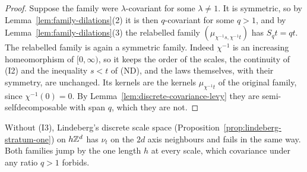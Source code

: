 \begin{proof}
Suppose the family were $\lambda$-covariant for some $\lambda \ne 1$. It is symmetric, so by
Lemma~\ref{lem:family-dilations}(2) it is then $q$-covariant for some $q > 1$, and by
Lemma~\ref{lem:family-dilations}(3) the relabelled family $(\mu_{\chi^{-1}s,\chi^{-1}t})$ has
$S_qt = qt$. The relabelled family is again a symmetric family. Indeed $\chi^{-1}$ is an increasing
homeomorphism of $[0,\infty)$, so it keeps the order of the scales, the continuity of (I2) and the
inequality $s < t$ of (ND), and the laws themselves, with their symmetry, are unchanged. Its
kernels are the kernels $\mu_{\chi^{-1}t}$ of the original family, since $\chi^{-1}(0) = 0$. By
Lemma~\ref{lem:discrete-covariance-levy} they are semi-selfdecomposable with span $q$, which they
are not.
\end{proof}

Without (I3), Lindeberg's discrete scale space (Proposition~\ref{prop:lindeberg-stratum-one}) on
$h\mathbb{Z}^d$ has $\nu_t$ on the $2d$ axis neighbours and fails in the same way. Both families jump by
the one length $h$ at every scale, which covariance under any ratio $q > 1$ forbids.

